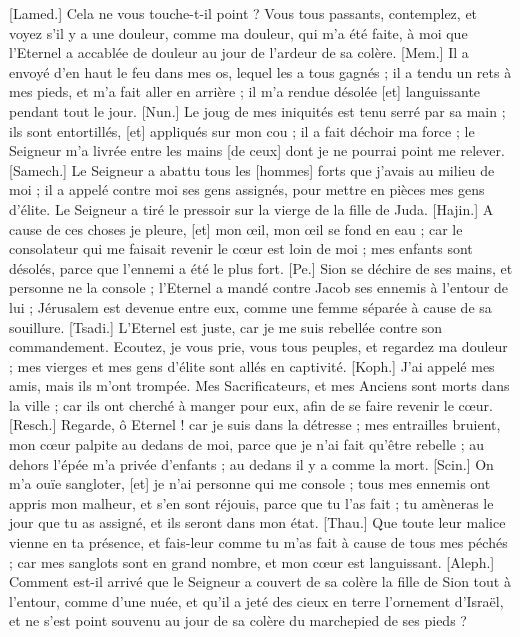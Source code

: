 \begin{multicols}{2}
[Lamed.] Cela ne vous touche-t-il point ? Vous tous passants, contemplez, et voyez s'il y a une douleur, comme ma douleur, qui m'a été faite, à moi que l'Eternel a accablée de douleur au jour de l'ardeur de sa colère.
[Mem.] Il a envoyé d'en haut le feu dans mes os, lequel les a tous gagnés ; il a tendu un rets à mes pieds, et m'a fait aller en arrière ; il m'a rendue désolée [et] languissante pendant tout le jour.
[Nun.] Le joug de mes iniquités est tenu serré par sa main ; ils sont entortillés, [et] appliqués sur mon cou ; il a fait déchoir ma force ; le Seigneur m’a livrée entre les mains [de ceux] dont je ne pourrai point me relever.
[Samech.] Le Seigneur a abattu tous les [hommes] forts que j'avais au milieu de moi ; il a appelé contre moi ses gens assignés, pour mettre en pièces mes gens d'élite. Le Seigneur a tiré le pressoir sur la vierge de la fille de Juda.
[Hajin.] A cause de ces choses je pleure, [et] mon œil, mon œil se fond en eau ; car le consolateur qui me faisait revenir le cœur est loin de moi ; mes enfants sont désolés, parce que l'ennemi a été le plus fort.
[Pe.] Sion se déchire de ses mains, et personne ne la console ; l'Eternel a mandé contre Jacob ses ennemis à l'entour de lui ; Jérusalem est devenue entre eux, comme une femme séparée à cause de sa souillure.
[Tsadi.] L'Eternel est juste, car je me suis rebellée contre son commandement. Ecoutez, je vous prie, vous tous peuples, et regardez ma douleur ; mes vierges et mes gens d'élite sont allés en captivité.
[Koph.] J'ai appelé mes amis, mais ils m'ont trompée. Mes Sacrificateurs, et mes Anciens sont morts dans la ville ; car ils ont cherché à manger pour eux, afin de se faire revenir le cœur.
[Resch.] Regarde, ô Eternel ! car je suis dans la détresse ; mes entrailles bruient, mon cœur palpite au dedans de moi, parce que je n'ai fait qu'être rebelle ; au dehors l’épée m’a privée d’enfants ; au dedans il y a comme la mort.
[Scin.] On m'a ouïe sangloter, [et] je n'ai personne qui me console ; tous mes ennemis ont appris mon malheur, et s’en sont réjouis, parce que tu l’as fait ; tu amèneras le jour que tu as assigné, et ils seront dans mon état.
[Thau.] Que toute leur malice vienne en ta présence, et fais-leur comme tu m'as fait à cause de tous mes péchés ; car mes sanglots sont en grand nombre, et mon cœur est languissant.
\VerseOne{}[Aleph.] Comment est-il arrivé que le Seigneur a couvert de sa colère la fille de Sion tout à l’entour, comme d’une nuée, et qu’il a jeté des cieux en terre l’ornement d’Israël, et ne s’est point souvenu au jour de sa colère du marchepied de ses pieds ?

\end{multicols}
